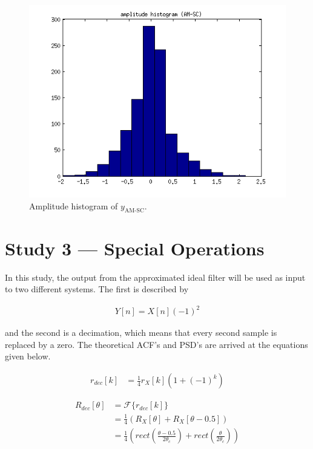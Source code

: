 \documentclass[10pt]{article}
\begin{document}
\begin{figure}[!hp]
    \begin{center}
      \includegraphics[width=1\textwidth]{amplitude_histogram_AM-SC}
    \caption{Amplitude histogram of $y_\text{AM-SC}$. \label{fig:TheoACFsimple}}
    \end{center}
\end{figure}

\newpage
\section{Study 3 --- Special Operations}
In this study, the output from the approximated ideal filter will be used as input to two different systems. The first is described by

\begin{align*}
Y[n] = X[n](-1)^2
\end{align*}

and the second is a decimation, which means that every second sample is replaced by a zero. The theoretical ACF's and PSD's are arrived at the equations given below.



\begin{align*}
r_{dec}[k] & =\frac{1}{4}r_X[k](1+(-1)^k)
\end{align*}

\begin{align*}
R_{dec}[\theta] & = \mathcal{F}\{r_{dec}[k]\} \nonumber \\
& = \frac{1}{4}(R_X[\theta]+R_X[\theta-0.5]) \nonumber \\
& = \frac{1}{4}(rect(\frac{\theta-0.5}{2\theta_c}) + rect(\frac{\theta}{2\theta_c}))
\end{align*}
\end{document}
